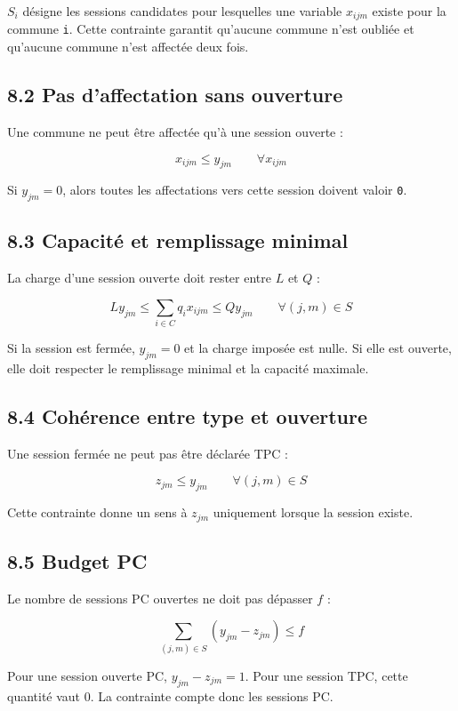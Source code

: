 \documentclass[11pt,a4paper]{article}
\begin{document}
$S_i$ désigne les sessions candidates pour lesquelles une variable $x_{ijm}$ existe pour la commune \texttt{i}. Cette contrainte garantit qu'aucune commune n'est oubliée et qu'aucune commune n'est affectée deux fois.

\subsection{8.2 Pas d'affectation sans ouverture}

Une commune ne peut être affectée qu'à une session ouverte :

\[
x_{ijm} \leq y_{jm}
\qquad
\forall x_{ijm}
\]

Si $y_{jm} = 0$, alors toutes les affectations vers cette session doivent valoir \texttt{0}.

\subsection{8.3 Capacité et remplissage minimal}

La charge d'une session ouverte doit rester entre $L$ et $Q$ :

\[
L y_{jm}
\leq
\sum_{i\in C} q_i x_{ijm}
\leq
Q y_{jm}
\qquad
\forall (j,m)\in S
\]

Si la session est fermée, $y_{jm} = 0$ et la charge imposée est nulle. Si elle est ouverte, elle doit respecter le remplissage minimal et la capacité maximale.

\subsection{8.4 Cohérence entre type et ouverture}

Une session fermée ne peut pas être déclarée TPC :

\[
z_{jm} \leq y_{jm}
\qquad
\forall (j,m)\in S
\]

Cette contrainte donne un sens à $z_{jm}$ uniquement lorsque la session existe.

\subsection{8.5 Budget PC}

Le nombre de sessions PC ouvertes ne doit pas dépasser $f$ :

\[
\sum_{(j,m)\in S} (y_{jm}-z_{jm}) \leq f
\]

Pour une session ouverte PC, $y_{jm} - z_{jm} = 1$. Pour une session TPC, cette quantité vaut $0$. La contrainte compte donc les sessions PC.
\end{document}
